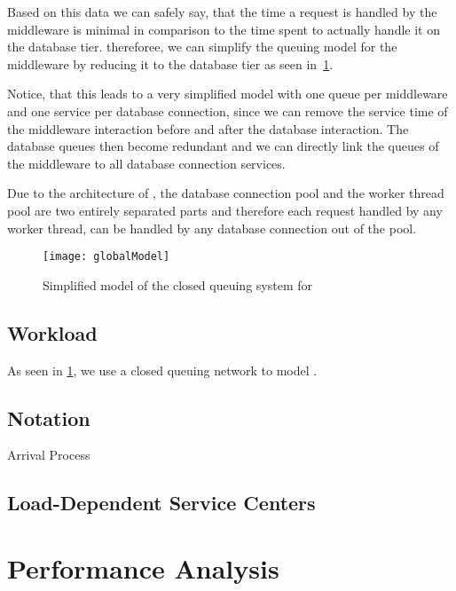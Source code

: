 \documentclass[a4paper, oneside]{csthesis}
\begin{document}
    Based on this data we can safely say, that the time a request is handled by
    the middleware is minimal in comparison to the time spent to actually handle
    it on the database tier. thereforee, we can simplify the queuing model for
    the middleware by reducing it to the database tier as seen in~\cref{fig:globalModel}.
    
    Notice, that this leads to a very simplified model with one queue per
    middleware and one service per database connection, since we can remove the
    service time of the middleware interaction before and after the database
    interaction. The database queues then become redundant and we can directly
    link the queues of the middleware to all database connection services.
    
    Due to the architecture of \telesto, the database connection pool and the
    worker thread pool are two entirely separated parts and therefore each
    request handled by any worker thread, can be handled by any database connection out
    of the pool.

    \begin{figure}[t]
        \centering
            \texttt{[image: globalModel]}
            \caption{Simplified model of the closed queuing system for \telesto}
            \label{fig:globalModel}
    \end{figure}

\section{Workload}
    As seen in \cref{fig:globalModel}, we use a closed queuing network to model
    \telesto.

\section{Notation}

\begin{description}
\item[Arrival Process]

\end{description}

\section{Load-Dependent Service Centers}



\chapter{Performance Analysis}
\end{document}
